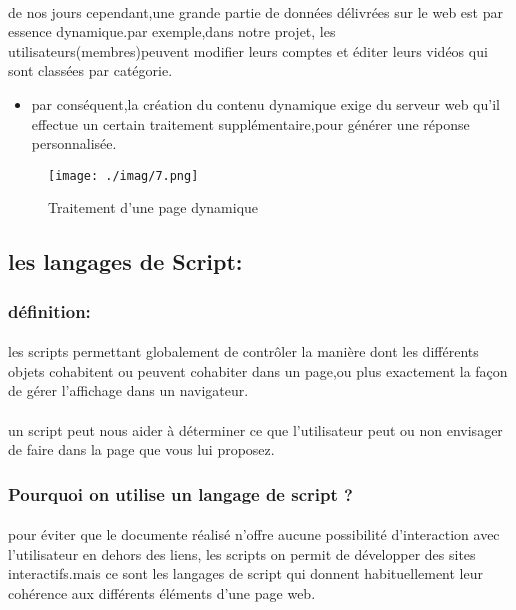 \paragraph{}
de nos jours cependant,une grande partie de données délivrées sur le web est par essence dynamique.par exemple,dans notre projet, les utilisateurs(membres)peuvent modifier leurs comptes et éditer leurs vidéos qui sont classées par catégorie.
\begin{itemize}
	\item par conséquent,la création du contenu dynamique exige du serveur web qu'il effectue un certain traitement supplémentaire,pour générer une réponse personnalisée.
\end{itemize}
\begin{figure}[h]
	\centering
	\texttt{[image: ./imag/7.png]}
	\caption{Traitement d'une page dynamique}
\end{figure}
\subsection{les langages de Script:}
\subsubsection{définition:}
\paragraph{}
les scripts permettant globalement de contrôler la manière dont les différents objets cohabitent ou peuvent cohabiter dans un page,ou plus exactement la façon de gérer l'affichage dans un navigateur.
\paragraph{}
un script peut nous aider à déterminer ce que l'utilisateur peut ou non envisager de faire dans la page que vous lui proposez.
\subsubsection{Pourquoi on utilise un langage de script ?}
\paragraph{}
pour éviter que le documente réalisé n'offre aucune possibilité d'interaction avec l'utilisateur en dehors des liens, les scripts on permit de développer des sites interactifs.mais ce sont les langages de script qui donnent habituellement leur cohérence aux différents éléments d'une page web.
